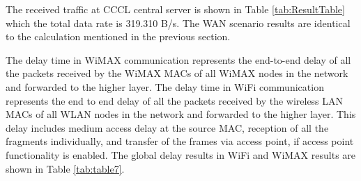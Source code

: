 \documentclass[conference, letterpaper]{IEEEtran}
\begin{document}

The received traffic at CCCL central server is shown in Table \ref{tab:ResultTable} which the total data rate is 319.310 B/s. The WAN scenario results are identical to the calculation mentioned in the previous section. 

The delay time in WiMAX communication represents the end-to-end delay of all the packets received by the WiMAX MACs of all WiMAX nodes in the network and forwarded to the higher layer. The delay time in WiFi communication represents the end to end delay of all the packets received by the wireless LAN MACs of all WLAN nodes in the network and forwarded to the higher layer. This delay includes medium access delay at the source MAC, reception of all the fragments individually, and transfer of the frames via access point, if access point functionality is enabled.
The global delay results in WiFi and WiMAX results are shown in Table \ref{tab:table7}. 
\end{document}
